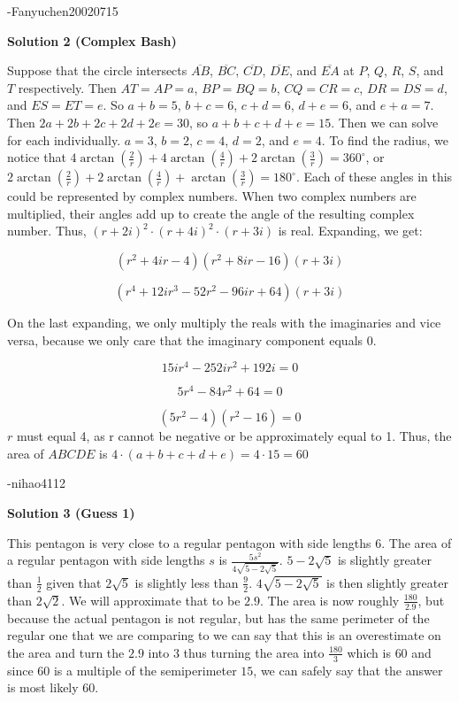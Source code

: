 \begin{enumerate}
 -Fanyuchen20020715

 



\textbf{Solution 2 (Complex Bash)}

Suppose that the circle intersects $\overline{AB}$, $\overline{BC}$, $\overline{CD}$, $\overline{DE}$, and $\overline{EA}$ at $P$, $Q$, $R$, $S$, and $T$ respectively. Then $AT = AP = a$, $BP = BQ = b$, $CQ = CR = c$, $DR = DS = d$, and $ES = ET = e$. So $a + b = 5$, $b + c = 6$, $c + d = 6$, $d + e = 6$, and $e + a = 7$. Then $2a + 2b + 2c + 2d + 2e = 30$, so $a + b + c + d + e= 15$. Then we can solve for each individually. $a = 3$, $b = 2$, $c = 4$, $d = 2$, and $e = 4$. To find the radius, we notice that $4 \arctan(\frac{2}{r}) + 4 \arctan(\frac{4}{r}) + 2 \arctan (\frac{3}{r}) = 360 ^ \circ$, or $2 \arctan(\frac{2}{r}) + 2 \arctan(\frac{4}{r}) + \arctan (\frac{3}{r}) = 180 ^ \circ$. Each of these angles in this could be represented by complex numbers. When two complex numbers are multiplied, their angles add up to create the angle of the resulting complex number. Thus, $(r + 2i)^2 \cdot (r + 4i)^2 \cdot (r + 3i)$ is real. Expanding, we get:

 
 \[(r^2 + 4ir - 4)(r^2 + 8ir -16)(r + 3i)\]

 \[(r^4 + 12ir^3 - 52r^2 - 96ir + 64)(r + 3i)\]

 On the last expanding, we only multiply the reals with the imaginaries and vice versa, because we only care that the imaginary component equals 0.

 
 \[15ir^4 - 252ir^2 + 192i = 0\]

 \[5r^4 - 84r^2 + 64 = 0\]

 \[(5r^2 - 4)(r^2 - 16) = 0\]
$r$ must equal 4, as r cannot be negative or be approximately equal to 1. Thus, the area of $ABCDE$ is $4 \cdot (a + b + c + d + e) = 4 \cdot 15 = \boxed{60}$

 -nihao4112

 



\textbf{Solution 3 (Guess 1)}

This pentagon is very close to a regular pentagon with side lengths $6$. The area of a regular pentagon with side lengths $s$ is $\frac{5s^2}{4\sqrt{5-2\sqrt{5}}}$. $5-2\sqrt{5}$ is slightly greater than $\frac{1}{2}$ given that $2\sqrt{5}$ is slightly less than $\frac{9}{2}$. $4\sqrt{5-2\sqrt{5}}$ is then slightly greater than $2\sqrt{2}$. We will approximate that to be $2.9$. The area is now roughly $\frac{180}{2.9}$, but because the actual pentagon is not regular, but has the same perimeter of the regular one that we are comparing to we can say that this is an overestimate on the area and turn the $2.9$ into $3$ thus turning the area into $\frac{180}{3}$ which is $60$ and since $60$ is a multiple of the semiperimeter $15$, we can safely say that the answer is most likely $\boxed{60}$.


\end{enumerate}

